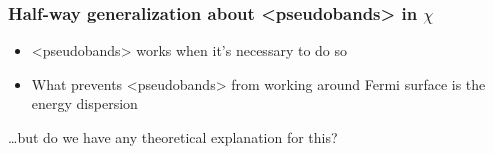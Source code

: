 \documentclass[t]{beamer}
\newcommand{\shortcode}[1]{\texttt{#1}}
\def\texttt#1{<#1>}%
\begin{document}
\begin{frame}
\frametitle{Half-way generalization about \shortcode{pseudobands} in $\chi$}

\begin{itemize}
    \item[\faHandPointRight] \shortcode{pseudobands} works  
    when it's necessary to do so 
    \item[\faHandPointRight] What prevents \shortcode{pseudobands} from working 
    around Fermi surface is the energy dispersion
\end{itemize}

\vspace{0.5cm}

\dots but do we have any theoretical explanation for this?

\end{frame}
\end{document}

